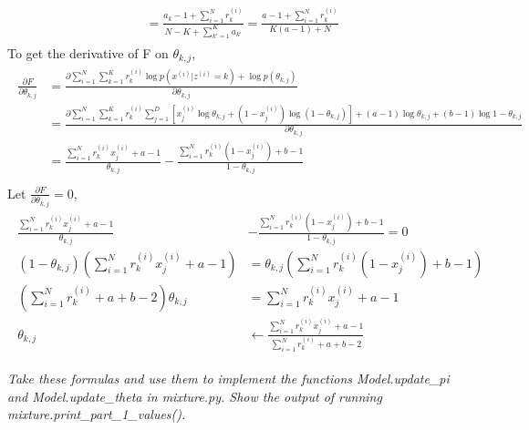 \documentclass{myhw}
\begin{document}
\begin{homeworkProblem}
\begin{homeworkSection}
\begin{gather*}
\begin{aligned}
& =  \frac{ a_k - 1 + \sum_{i=1}^{N} r_k^{(i)} }{ N - K + \sum_{k'=1}^K a_{k'} } =\frac{a-1+\sum_{i=1}^{N} r_k^{(i)}}{K(a-1)+N}
\end{aligned}
\end{gather*}
To get the derivative of F on $\theta_{k,j}$,
\begin{gather*}
\begin{aligned}
\frac{\partial F}{\partial \theta_{k,j}} & = \frac{\partial \sum_{i=1}^{N}\sum_{k=1}^{K}r_k^{(i)} \log{p(x^{(i)}|z^{(i)}=k)} + \log{p(\theta_{k,j})} }{\partial \theta_{k,j}} \\
& = \frac{\partial \sum_{i=1}^{N}\sum_{k=1}^{K}r_k^{(i)} \sum_{j=1}^D [x_j^{(i)} \log{\theta_{k,j}} + (1-x_j^{(i)}) \log{(1-\theta_{k,j})}] + (a-1) \log{\theta_{k,j}} + (b-1) \log{1-\theta_{k,j}} }{\partial \theta_{k,j}} \\
& = \frac{ \sum_{i=1}^{N} r_k^{(i)} x_j^{(i)} + a - 1 }{\theta_{k,j}} - \frac{ \sum_{i=1}^{N} r_k^{(i)} (1 - x_j^{(i)}) + b - 1 }{1 - \theta_{k,j}} \\
\end{aligned}
\end{gather*}
Let $ \frac{\partial F}{\partial \theta_{k,j}} = 0$,
\begin{gather*}
\begin{aligned}
\frac{ \sum_{i=1}^{N} r_k^{(i)} x_j^{(i)} + a - 1 }{\theta_{k,j}} & - \frac{ \sum_{i=1}^{N} r_k^{(i)} (1 - x_j^{(i)}) + b - 1 }{1 - \theta_{k,j}} = 0 \\
(1 - \theta_{k,j}) (\sum_{i=1}^{N} r_k^{(i)} x_j^{(i)} + a - 1) & = \theta_{k,j} (\sum_{i=1}^{N} r_k^{(i)} (1 - x_j^{(i)}) + b - 1)
 \\
 (\sum_{i=1}^{N} r_k^{(i)} + a + b - 2) \theta_{k,j} & = \sum_{i=1}^{N} r_k^{(i)} x_j^{(i)} + a - 1 \\
 \theta_{k,j} & \leftarrow \frac{\sum_{i=1}^{N} r_k^{(i)} x_j^{(i)} + a - 1}{\sum_{i=1}^{N} r_k^{(i)} + a + b - 2}
\end{aligned}
\end{gather*}
\end{homeworkSection}
\begin{homeworkSection}	
\emph{Take these formulas and use them to implement the functions Model.update\_pi and Model.update\_theta in mixture.py. Show the output of running mixture.print\_part\_1\_values(). } \\
\\
\end{homeworkSection}
\begin{homeworkSection}	
\emph{} \\
\\
\end{homeworkSection}
\end{homeworkProblem}
\end{document}
